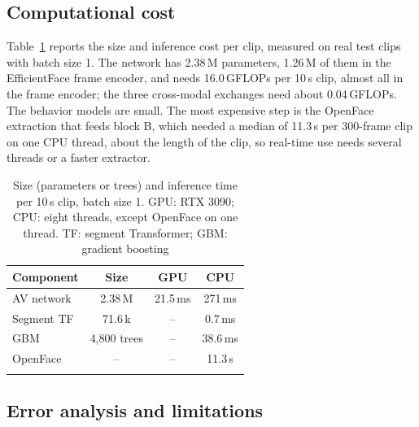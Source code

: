 \documentclass[pdflatex,iicol,sn-basic]{sn-jnl}
\begin{document}
\subsection{Computational cost}\label{sec:res_cost}

Table~\ref{tab:cost} reports the size and inference cost per clip, measured on real test clips with batch size 1. The network has 2.38\,M parameters, 1.26\,M of them in the EfficientFace frame encoder, and needs 16.0\,GFLOPs per 10\,s clip, almost all in the frame encoder; the three cross-modal exchanges need about 0.04\,GFLOPs. The behavior models are small. The most expensive step is the OpenFace extraction that feeds block B, which needed a median of 11.3\,s per 300-frame clip on one CPU thread, about the length of the clip, so real-time use needs several threads or a faster extractor.

\begin{table}[t]
\caption{Size (parameters or trees) and inference time per 10\,s clip, batch size 1. GPU: RTX 3090; CPU: eight threads, except OpenFace on one thread. TF: segment Transformer; GBM: gradient boosting}\label{tab:cost}
\begin{tabular*}{\columnwidth}{@{\extracolsep\fill}lccc}
\toprule
Component & Size & GPU & CPU\\
\midrule
AV network & 2.38\,M & 21.5\,ms & 271\,ms\\
Segment TF & 71.6\,k & -- & 0.7\,ms\\
GBM & 4,800 trees & -- & 38.6\,ms\\
OpenFace & -- & -- & 11.3\,s\\
\botrule
\end{tabular*}
\end{table}

\subsection{Error analysis and limitations}\label{sec:res_errors}
\end{document}

